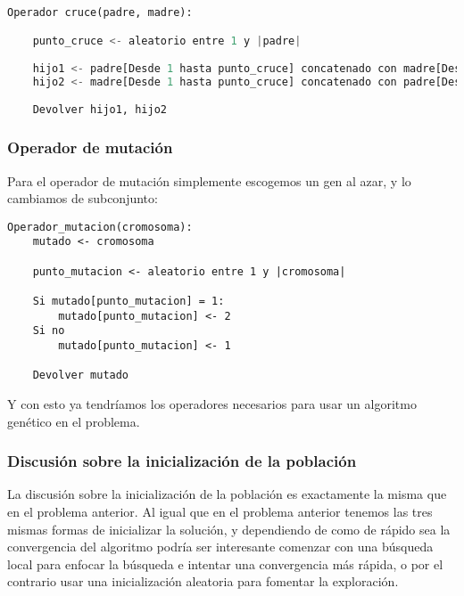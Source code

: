 \begin{lstlisting}[language=python]
Operador cruce(padre, madre):

	punto_cruce <- aleatorio entre 1 y |padre|

	hijo1 <- padre[Desde 1 hasta punto_cruce] concatenado con madre[Desde punto_cruce hasta |madre|]
	hijo2 <- madre[Desde 1 hasta punto_cruce] concatenado con padre[Desde punto_cruce hasta |padre|]

	Devolver hijo1, hijo2
\end{lstlisting}


\subsubsection{Operador de mutación}

Para el operador de mutación simplemente escogemos un gen al azar, y lo cambiamos de subconjunto:

\begin{lstlisting}
Operador_mutacion(cromosoma):
	mutado <- cromosoma

	punto_mutacion <- aleatorio entre 1 y |cromosoma|

	Si mutado[punto_mutacion] = 1:
		mutado[punto_mutacion] <- 2
	Si no
		mutado[punto_mutacion] <- 1

	Devolver mutado
\end{lstlisting}

Y con esto ya tendríamos los operadores necesarios para usar un algoritmo genético en el problema.

\subsubsection{Discusión sobre la inicialización de la población}

La discusión sobre la inicialización de la población es exactamente la misma que en el problema anterior. Al igual que en el problema anterior tenemos las tres mismas formas de inicializar la solución, y dependiendo de como de rápido sea la convergencia del algoritmo podría ser interesante comenzar con una búsqueda local para enfocar la búsqueda e intentar una convergencia más rápida, o por el contrario usar una inicialización aleatoria para fomentar la exploración.
